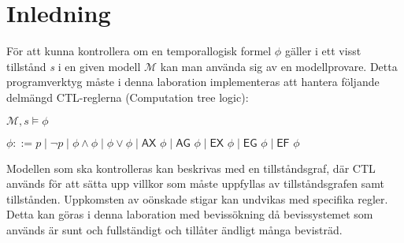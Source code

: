 \section{Inledning}
För att kunna kontrollera om en temporallogisk formel $\phi$ gäller i ett visst tillstånd \textit{s} i en given modell $\mathcal{M}$ kan man använda sig
av en modellprovare. Detta programverktyg måste i denna laboration implementeras att hantera följande delmängd CTL-reglerna (Computation tree
logic):

\begin{center}

$\mathcal{M} , s \models \phi$

$\phi ::= p \mid \neg p \mid \phi \wedge \phi \mid \phi \vee \phi \mid \textsf{AX } \phi \mid \textsf{AG } \phi \mid \textsf{EX } \phi \mid \textsf{EG } \phi \mid \textsf{EF } \phi $

\end{center}

Modellen som ska kontrolleras kan beskrivas med en tillståndsgraf, där CTL används för att sätta upp villkor som måste uppfyllas av tillståndsgrafen samt tillstånden. Uppkomsten av oönskade stigar kan undvikas med specifika regler. Detta kan göras i denna laboration med bevissökning då bevissystemet som används är sunt och fullständigt och tillåter ändligt många bevisträd.